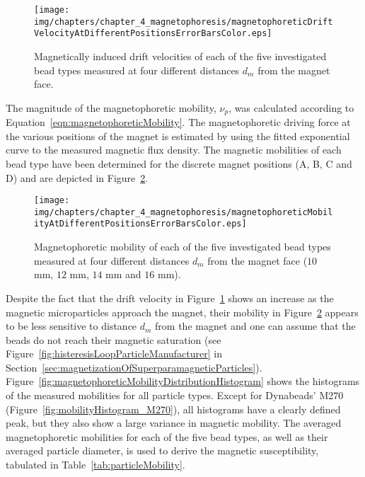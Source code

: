 \begin{figure}[htb]
   \centering
   \texttt{[image: img/chapters/chapter\_4\_magnetophoresis/magnetophoreticDriftVelocityAtDifferentPositionsErrorBarsColor.eps]}
   \caption[Magnetically induced velocities of different particle types]{Magnetically induced drift velocities of each of the five investigated bead types measured at four different distances $d_{m}$ from the magnet face.}
   \label{fig:magnetophoreticDriftVelocityAtDifferentPositions}
\end{figure}

The magnitude of the magnetophoretic mobility, $\nu_{p}$, was calculated according to Equation~\ref{eqn:magnetophoreticMobility}. The magnetophoretic driving force at the various positions of the magnet is estimated by using the fitted exponential curve to the measured magnetic flux density. The magnetic mobilities of each bead type have been determined for the discrete magnet positions (A, B, C and D) and are depicted in Figure~\ref{fig:magnetophoreticMobilityAtDifferentPositions}.

\begin{figure}[htb]
   \centering
   \texttt{[image: img/chapters/chapter\_4\_magnetophoresis/magnetophoreticMobilityAtDifferentPositionsErrorBarsColor.eps]}
   \caption[Magnetophoretic mobility of different particle types]{Magnetophoretic mobility of each of the five investigated bead types measured at four different distances $d_{m}$ from the magnet face ($10$ mm, $12$ mm, $14$ mm and $16$ mm).}
   \label{fig:magnetophoreticMobilityAtDifferentPositions}
\end{figure}
 
Despite the fact that the drift velocity in Figure~\ref{fig:magnetophoreticDriftVelocityAtDifferentPositions} shows an increase as the magnetic microparticles approach the magnet, their mobility in Figure~\ref{fig:magnetophoreticMobilityAtDifferentPositions} appears to be less sensitive to distance $d_{m}$ from the magnet and one can assume that the beads do not reach their magnetic saturation (see Figure~\ref{fig:histeresisLoopParticleManufacturer} in Section~\ref{sec:magnetizationOfSuperparamagneticParticles}). Figure~\ref{fig:magnetophoreticMobilityDistributionHistogram} shows the histograms of the measured mobilities for all particle types. Except for Dynabeads' M270 (Figure~\ref{fig:mobilityHistogram_M270}), all histograms have a clearly defined peak, but they also show a large variance in magnetic mobility. The averaged magnetophoretic mobilities for each of the five bead types, as well as their averaged particle diameter, is used to derive the magnetic susceptibility, tabulated in Table~\ref{tab:particleMobility}.

